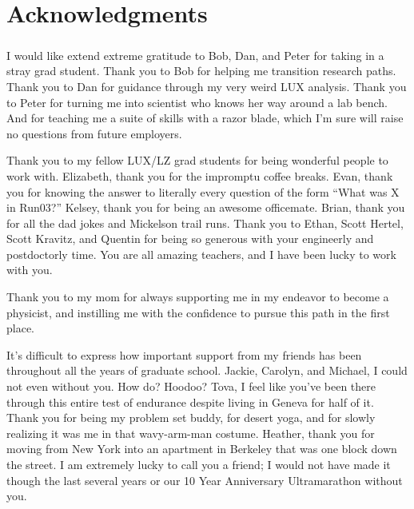 

\bigskip


\begingroup

\let\clearpage\relax
\let\cleardoublepage\relax
\let\cleardoublepage\relax

\chapter*{Acknowledgments}

\paragraph{} I would like extend extreme gratitude to Bob, Dan, and Peter for taking in a stray grad student. Thank you to Bob for helping me transition research paths. Thank you to Dan for guidance through my very weird LUX analysis. Thank you to Peter for turning me into scientist who knows her way around a lab bench. And for teaching me a suite of skills with a razor blade, which I'm sure will raise no questions from future employers. %

Thank you to my fellow LUX/LZ grad students for being wonderful people to work with. Elizabeth, thank you for the impromptu coffee breaks. Evan, thank you for knowing the answer to literally every question of the form ``What was X in Run03?''  Kelsey, thank you for being an awesome officemate. Brian, thank you for all the dad jokes and Mickelson trail runs. Thank you to Ethan, Scott Hertel, Scott Kravitz, and Quentin for being so generous with your engineerly and postdoctorly time. You are all amazing teachers, and I have been lucky to work with you.     %

Thank you to my mom for always supporting me in my endeavor to become a physicist, and instilling me with the confidence to pursue this path in the first place. %

It's difficult to express how important support from my friends has been throughout all the years of graduate school. Jackie, Carolyn, and Michael, I could not even without you. How do? Hoodoo? Tova, I feel like you've been there through this entire test of endurance despite living in Geneva for half of it. Thank you for being my problem set buddy, for desert yoga, and for slowly realizing it was me in that wavy-arm-man costume. Heather, thank you for moving from New York into an apartment in Berkeley that was one block down the street. I am extremely lucky to call you a friend; I would not have made it though the last several years or our 10 Year Anniversary Ultramarathon without you. %

